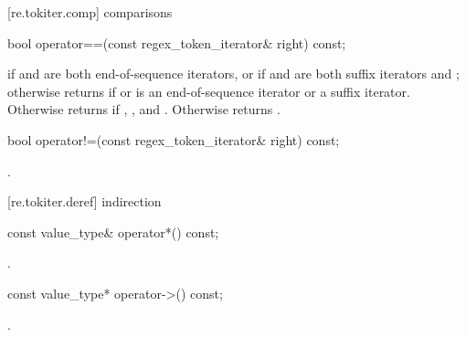 [re.tokiter.comp]{ comparisons}

%
%
\begin{itemdecl}
bool operator==(const regex_token_iterator& right) const;
\end{itemdecl}

\begin{itemdescr}
\pnum
\returns  {} if  and  are both end-of-sequence iterators,
or if  and  are both suffix iterators and ;
otherwise returns  if  or  is an end-of-sequence
iterator or a suffix iterator. Otherwise returns  if ,
, and . Otherwise returns .
\end{itemdescr}

%
%
\begin{itemdecl}
bool operator!=(const regex_token_iterator& right) const;
\end{itemdecl}

\begin{itemdescr}
\pnum\returns  {}.
\end{itemdescr}

[re.tokiter.deref]{ indirection}

%
%
\begin{itemdecl}
const value_type& operator*() const;
\end{itemdecl}

\begin{itemdescr}
\pnum\returns  {}.
\end{itemdescr}


%
%
\begin{itemdecl}
const value_type* operator->() const;
\end{itemdecl}

\begin{itemdescr}
\pnum\returns  {}.
\end{itemdescr}


